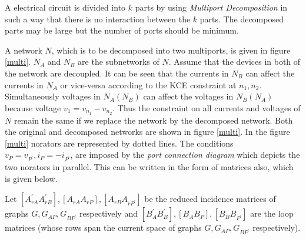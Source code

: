 \documentclass[10pt,psfig,letterpaper,twocolumn]{article}
\begin{document}
A electrical circuit is divided into $k$ parts by using {\it Multiport Decomposition} \cite{HN} in such a way that there is no 
interaction between the $k$ parts. The decomposed parts may be large but the number of ports should be minimum. \par
A network $N$, which is to be decomposed into two multiports, is given in figure \ref{multi}. $N_{A}$ and $N_{B}$ are the 
subnetworks of $N$. Assume that the devices in both of the network are decoupled.
It can be seen that the currents in $N_{B}$ can affect the currents in $N_{A}$ or vice-versa
according to the KCE constraint at $n_{1},n_{2}$. Simultaneously voltages in $N_{A}(N_{B})$ can affect the
voltages in $N_{B}(N_{A})$ because voltage $v_{1} = v_{n_{1}} - v_{n_{2}}$. Thus the constraint on
all currents and voltages of $N$ remain the same if we replace the network by the decomposed network. Both 
the original and decomposed networks are shown in figure \ref{multi}. In the figure \ref{multi} norators are 
represented by dotted lines. The conditions $v_{P} = v_{P^{'}}, i_{P} = -i_{P^{'}}$, are imposed by the 
{\it port connection diagram} which depicts the two norators in parallel. This can be written in the form 
of matrices also, which is given below.\par 

\hspace{1in}Let $[A_{rA}^{'} A_{rB}^{'}], [A_{rA} A_{rP}], [A_{rB} A_{rP^{'}}]$
be the reduced incidence matrices of graphs $G, G_{AP}, G_{BP^{'}}$ respectively and $[B_{A}^{'}
B_{B}^{'}], [B_{A} B_{P}], [B_{B} B_{P^{'}}]$ are the loop matrices (whose rows span the current space
of graphs $G, G_{AP}, G_{BP^{'}}$ respectively).
\end{document}

